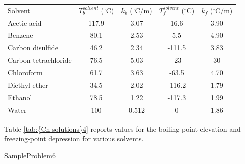 \documentclass[main.tex]{subfiles}
\newcommand\chapterlabel{Ch-solutions}\setcounter{figurenewcounter}{0}\setcounter{tablenewcounter}{0}\setcounter{formulanewcounter}{0}
\begin{document}
\begin{description}
 \begin{center}
  \label{tab:{\chapterlabel}4}
\selectfont
\begin{tabular}{lllll}
\rowcolor{black!45}
\toprule
\multicolumn{5}{l}{\hypersetup{colorlinks,linkcolor={white}} \cellcolor{black}\color{white}\bfseries\small Table \ref{tab:{\chapterlabel}4} Boiling-point elevation and freezing-point depression for various solvents } \\
\midrule
 \rowcolor{gray!10} Solvent &\multicolumn{1}{c}{$T^{solvent}_b$ ($^{\circ}$C)}&  \multicolumn{1}{c}{$k_b$ ($^{\circ}$C/m)} &  \multicolumn{1}{c}{$T^{solvent}_f$ ($^{\circ}$C)}&\multicolumn{1}{c}{$k_f$ ($^{\circ}$C/m)}\\
\midrule
Acetic acid	& \multicolumn{1}{c}{117.9 }& \multicolumn{1}{c}{3.07 } & \multicolumn{1}{c}{16.6 }& \multicolumn{1}{c}{3.90 } \\ 
 Benzene	& \multicolumn{1}{c}{80.1 }& \multicolumn{1}{c}{2.53 } & \multicolumn{1}{c}{5.5 }& \multicolumn{1}{c}{4.90 } \\ 
Carbon disulfide	& \multicolumn{1}{c}{46.2 }& \multicolumn{1}{c}{2.34 } & \multicolumn{1}{c}{-111.5 }& \multicolumn{1}{c}{3.83 } \\ 
Carbon tetrachloride	& \multicolumn{1}{c}{76.5 }& \multicolumn{1}{c}{5.03 } & \multicolumn{1}{c}{-23 }& \multicolumn{1}{c}{30 } \\ 
Chloroform	& \multicolumn{1}{c}{61.7 }& \multicolumn{1}{c}{3.63 } & \multicolumn{1}{c}{-63.5 }& \multicolumn{1}{c}{4.70 } \\ 
Diethyl ether	& \multicolumn{1}{c}{34.5 }& \multicolumn{1}{c}{2.02 } & \multicolumn{1}{c}{-116.2 }& \multicolumn{1}{c}{1.79 } \\ 
Ethanol	& \multicolumn{1}{c}{78.5 }& \multicolumn{1}{c}{1.22 } & \multicolumn{1}{c}{-117.3 }& \multicolumn{1}{c}{1.99 } \\ 
Water	& \multicolumn{1}{c}{100 }& \multicolumn{1}{c}{0.512 } & \multicolumn{1}{c}{0 }& \multicolumn{1}{c}{1.86 } \\ 

 \bottomrule
\end{tabular}\end{center} 
Table \ref{tab:{\chapterlabel}4} reports values for the boiling-point elevation and freezing-point depression for various solvents.

{SampleProblem6}







\end{description}
\end{document}
